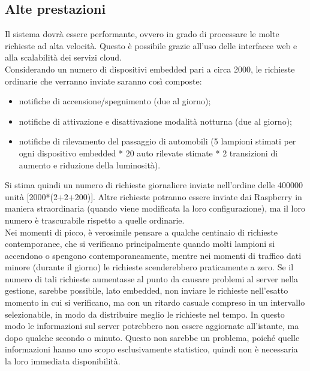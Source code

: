 \subsection{Alte prestazioni}
Il sistema dovrà essere performante, ovvero in grado di processare le molte richieste ad alta velocità.
Questo è possibile grazie all'uso delle interfacce web e alla scalabilità dei servizi cloud.
\\Considerando un numero di dispositivi embedded pari a circa 2000, le richieste ordinarie che verranno inviate saranno così composte:
\begin{itemize}
 \item notifiche di accensione/spegnimento (due al giorno);
 \item notifiche di attivazione e disattivazione modalità notturna (due al giorno);
 \item notifiche di rilevamento del passaggio di automobili (5 lampioni stimati per ogni dispositivo embedded * 20 auto rilevate stimate * 2 transizioni di aumento e riduzione della luminosità).
\end{itemize}
Si stima quindi un numero di richieste giornaliere inviate nell'ordine delle 400000 unità [2000*(2+2+200)].
Altre richieste potranno essere inviate dai Raspberry in maniera straordinaria (quando viene modificata la loro configurazione), ma il loro numero è trascurabile rispetto a quelle ordinarie.
\\Nei momenti di picco, è verosimile pensare a qualche centinaio di richieste contemporanee, che si verificano principalmente quando molti lampioni si accendono o spengono contemporaneamente, mentre nei momenti di traffico dati minore (durante il giorno) le richieste scenderebbero praticamente a zero.
Se il numero di tali richieste aumentasse al punto da causare problemi al server nella gestione, sarebbe possibile, lato embedded, non inviare le richieste nell'esatto momento in cui si verificano, ma con un ritardo casuale compreso in un intervallo selezionabile, in modo da distribuire meglio le richieste nel tempo.
In questo modo le informazioni sul server potrebbero non essere aggiornate all’istante, ma dopo qualche secondo o minuto.
Questo non sarebbe un problema, poiché quelle informazioni hanno uno scopo esclusivamente statistico, quindi non è necessaria la loro immediata disponibilità.


